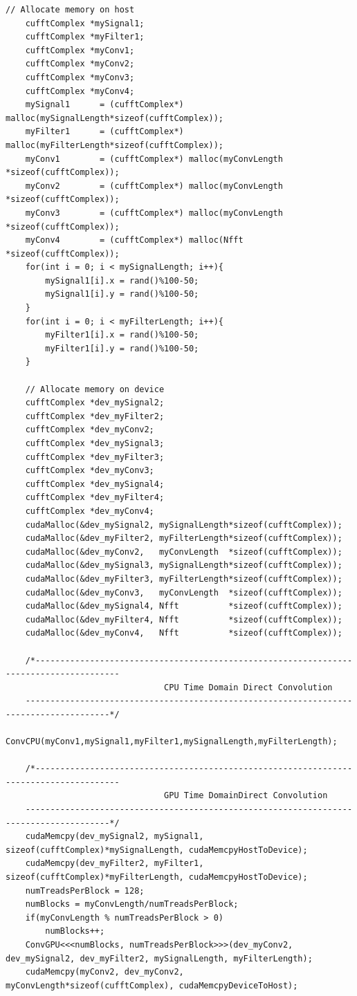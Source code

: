 \begin{lstlisting}[caption={CUDA code to performing complex convolution four different ways: time domain CPU, time domain GPU, time domain GPU using shared memory and frequency domain GPU.},label={code:convFun}]
	// Allocate memory on host
	cufftComplex *mySignal1;
	cufftComplex *myFilter1;
	cufftComplex *myConv1;
	cufftComplex *myConv2;
	cufftComplex *myConv3;
	cufftComplex *myConv4;
	mySignal1      = (cufftComplex*) malloc(mySignalLength*sizeof(cufftComplex));
	myFilter1      = (cufftComplex*) malloc(myFilterLength*sizeof(cufftComplex));
	myConv1        = (cufftComplex*) malloc(myConvLength  *sizeof(cufftComplex));
	myConv2        = (cufftComplex*) malloc(myConvLength  *sizeof(cufftComplex));
	myConv3        = (cufftComplex*) malloc(myConvLength  *sizeof(cufftComplex));
	myConv4        = (cufftComplex*) malloc(Nfft       *sizeof(cufftComplex));
	for(int i = 0; i < mySignalLength; i++){
		mySignal1[i].x = rand()%100-50;
		mySignal1[i].y = rand()%100-50;
	}
	for(int i = 0; i < myFilterLength; i++){
		myFilter1[i].x = rand()%100-50;
		myFilter1[i].y = rand()%100-50;
	}

	// Allocate memory on device
	cufftComplex *dev_mySignal2;
	cufftComplex *dev_myFilter2;
	cufftComplex *dev_myConv2;
	cufftComplex *dev_mySignal3;
	cufftComplex *dev_myFilter3;
	cufftComplex *dev_myConv3;
	cufftComplex *dev_mySignal4;
	cufftComplex *dev_myFilter4;
	cufftComplex *dev_myConv4;
	cudaMalloc(&dev_mySignal2, mySignalLength*sizeof(cufftComplex));
	cudaMalloc(&dev_myFilter2, myFilterLength*sizeof(cufftComplex));
	cudaMalloc(&dev_myConv2,   myConvLength  *sizeof(cufftComplex));
	cudaMalloc(&dev_mySignal3, mySignalLength*sizeof(cufftComplex));
	cudaMalloc(&dev_myFilter3, myFilterLength*sizeof(cufftComplex));
	cudaMalloc(&dev_myConv3,   myConvLength  *sizeof(cufftComplex));
	cudaMalloc(&dev_mySignal4, Nfft          *sizeof(cufftComplex));
	cudaMalloc(&dev_myFilter4, Nfft          *sizeof(cufftComplex));
	cudaMalloc(&dev_myConv4,   Nfft          *sizeof(cufftComplex));

	/*---------------------------------------------------------------------------------------
                                CPU Time Domain Direct Convolution
	---------------------------------------------------------------------------------------*/
	ConvCPU(myConv1,mySignal1,myFilter1,mySignalLength,myFilterLength);

	/*---------------------------------------------------------------------------------------
                                GPU Time DomainDirect Convolution
	---------------------------------------------------------------------------------------*/
	cudaMemcpy(dev_mySignal2, mySignal1, sizeof(cufftComplex)*mySignalLength, cudaMemcpyHostToDevice);
	cudaMemcpy(dev_myFilter2, myFilter1, sizeof(cufftComplex)*myFilterLength, cudaMemcpyHostToDevice);
	numTreadsPerBlock = 128;
	numBlocks = myConvLength/numTreadsPerBlock;
	if(myConvLength % numTreadsPerBlock > 0)
		numBlocks++;
	ConvGPU<<<numBlocks, numTreadsPerBlock>>>(dev_myConv2, dev_mySignal2, dev_myFilter2, mySignalLength, myFilterLength);
	cudaMemcpy(myConv2, dev_myConv2, myConvLength*sizeof(cufftComplex), cudaMemcpyDeviceToHost);



\end{lstlisting}
